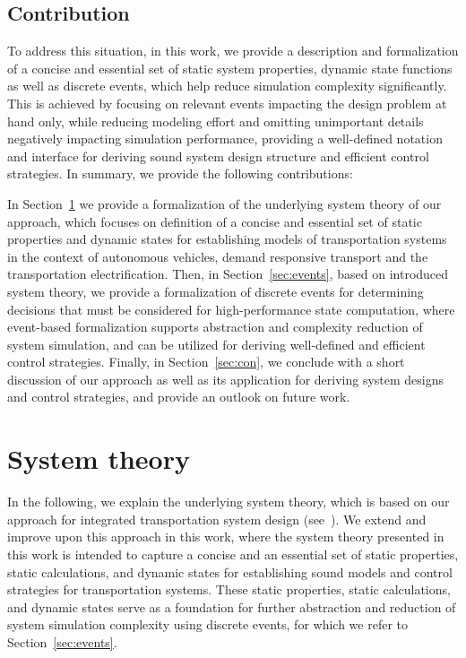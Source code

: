 \documentclass[graybox]{svmult}
\begin{document}
\subsection{Contribution}

To address this situation, in this work, we provide a description and formalization of a concise and essential set of static system properties, dynamic state functions as well as discrete events, which help reduce simulation complexity significantly. 
This is achieved by focusing on relevant events impacting the design problem at hand only, while reducing modeling effort and omitting unimportant details negatively impacting simulation performance, providing a well-defined notation and interface for deriving sound system design structure and efficient control strategies. In summary, we provide the following contributions:

In Section~\ref{sec:theory} we provide a formalization of the underlying system theory of our approach, which focuses on definition of a concise and essential set of static properties and dynamic states for establishing models of transportation systems in the context of autonomous vehicles, demand responsive transport and the transportation electrification.
Then, in Section~\ref{sec:events}, based on introduced system theory, we provide a formalization of discrete events for determining decisions that must be considered for high-performance state computation, where event-based formalization supports abstraction and complexity reduction of system simulation, and can be utilized for deriving well-defined and efficient control strategies. 
Finally, in Section~\ref{sec:con}, we conclude with a short discussion of our approach as well as its application for deriving system designs and control strategies, and provide an outlook on future work.

\section{System theory}
\label{sec:theory}

In the following, we explain the underlying system theory, which is based on our approach for integrated transportation system design (see~\cite{Ascher2014,Ascher2015,Ascher2016,Ascher2017}).
We extend and improve upon this approach in this work, where the system theory presented in this work is intended to capture a concise and an essential set of static properties, static calculations, and dynamic states for establishing sound models and control strategies for transportation systems.
These static properties, static calculations, and dynamic states serve as a foundation for further abstraction and reduction of system simulation complexity using discrete events, for which we refer to Section~\ref{sec:events}.
\end{document}
